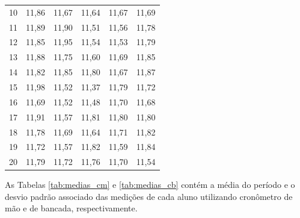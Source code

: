 \documentclass[12pt, a4paper, brazil]{article}
\begin{document}
\begin{table}[H]
\begin{tabular}{c c c c c c}
		10            & 11,86                     & 11,67                     & 11,64                     & 11,67                       & 11,69                     \\
		11            & 11,89                     & 11,90                     & 11,51                     & 11,56                       & 11,78                     \\
		12            & 11,85                     & 11,95                     & 11,54                     & 11,53                       & 11,79                     \\
		13            & 11,88                     & 11,75                     & 11,60                     & 11,69                       & 11,85                     \\
		14            & 11,82                     & 11,85                     & 11,80                     & 11,67                       & 11,87                     \\
		15            & 11,98                     & 11,52                     & 11,37                     & 11,79                       & 11,72                     \\
		16            & 11,69                     & 11,52                     & 11,48                     & 11,70                       & 11,68                     \\
		17            & 11,91                     & 11,57                     & 11,81                     & 11,80                       & 11,80                     \\
		18            & 11,78                     & 11,69                     & 11,64                     & 11,71                       & 11,82                     \\
		19            & 11,72                     & 11,57                     & 11,82                     & 11,59                       & 11,84                     \\
		20            & 11,79                     & 11,72                     & 11,76                     & 11,70                       & 11,54                     \\
		\hline
	\end{tabular}
	\label{tab:medições_cm}
\end{table}
As Tabelas \ref{tab:medias_cm} e \ref{tab:medias_cb}
contém a média do período e o desvio padrão associado das medições de cada aluno utilizando cronômetro de mão e de bancada, respectivamente.
\end{document}
